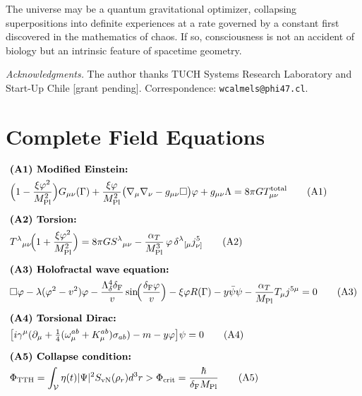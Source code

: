 \documentclass[12pt,a4paper]{article}
\newcommand{\MPl}{M_{\mathrm{Pl}}}
\newcommand{\phicrit}{\Phi_{\mathrm{crit}}}
\newcommand{\phiTTH}{\Phi_{\mathrm{TTH}}}
\newcommand{\tors}{T^{\lambda}{}_{\mu\nu}}
\newcommand{\spin}{S^{\lambda}{}_{\mu\nu}}
\newcommand{\Feig}{\delta_{\mathrm{F}}}
\newcommand{\SvN}{S_{\mathrm{vN}}}
\newcommand{\etacoupl}{\eta(t)}
\newcommand{\alphaT}{\alpha_T}
\numberwithin{equation}{section}
\begin{document}
The universe may be a quantum gravitational optimizer, collapsing superpositions
into definite experiences at a rate governed by a constant first discovered
in the mathematics of chaos. If so, consciousness is not an accident of biology
but an intrinsic feature of spacetime geometry.

\medskip\noindent
\textit{Acknowledgments.}
The author thanks TUCH Systems Research Laboratory and Start-Up Chile [grant pending].
Correspondence: \texttt{wcalmels@phi47.cl}.

\appendix

\section{Complete Field Equations}

\begin{align}
  &\text{\textbf{(A1) Modified Einstein:}}\notag\\
  &\Bigl(1-\frac{\xi\varphi^2}{\MPl^2}\Bigr)G_{\mu\nu}(\Gamma)
  + \frac{\xi\varphi}{\MPl^2}\bigl(\nabla_\mu\nabla_\nu - g_{\mu\nu}\Box\bigr)\varphi
  + g_{\mu\nu}\Lambda = 8\pi G T_{\mu\nu}^{\mathrm{total}}
  \tag{A1}\label{eq:A1}\\[6pt]
  &\text{\textbf{(A2) Torsion:}}\notag\\
  &\tors\!\Bigl(1+\frac{\xi\varphi^2}{\MPl^2}\Bigr)
  = 8\pi G\spin - \frac{\alphaT}{\MPl^3}\,\varphi\,\delta^\lambda{}_{[\mu}j^5_{\nu]}
  \tag{A2}\label{eq:A2}\\[6pt]
  &\text{\textbf{(A3) Holofractal wave equation:}}\notag\\
  &\Box\varphi - \lambda(\varphi^2-v^2)\varphi
  - \frac{\Lambda_\delta^4\Feig}{v}\sin\!\Bigl(\frac{\Feig\varphi}{v}\Bigr)
  - \xi\varphi R(\Gamma) - y\bar\psi\psi
  - \frac{\alphaT}{\MPl}T_\mu j^{5\mu} = 0
  \tag{A3}\label{eq:A3}\\[6pt]
  &\text{\textbf{(A4) Torsional Dirac:}}\notag\\
  &\bigl[i\gamma^\mu(\partial_\mu + \tfrac{1}{4}(\omega^{ab}_\mu+K^{ab}_\mu)\sigma_{ab}) - m - y\varphi\bigr]\psi = 0
  \tag{A4}\label{eq:A4}\\[6pt]
  &\text{\textbf{(A5) Collapse condition:}}\notag\\
  &\phiTTH = \int_\mathcal{V}\etacoupl|\Psi|^2\SvN(\rho_r)d^3r > \phicrit = \frac{\hbar}{\Feig\MPl}
  \tag{A5}\label{eq:A5}
\end{align}
\end{document}
